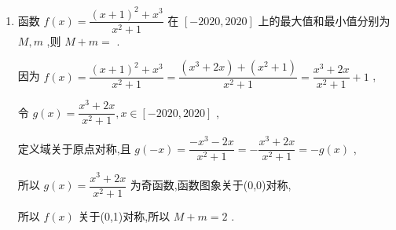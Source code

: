 \begin{enumerate}
\begin{jieda}
        于是 $h\left( {-{10}}\right)  =  - h\left( {10}\right)$ ,所以 $f\left( {-{10}}\right)  - {\left( -{10}\right) }^{2} + {2023} =  - \left\lbrack  {f\left( {10}\right)  - {10}^{2} + {2023}}\right\rbrack$ ,
        
        可得 $f\left( {-{10}}\right)  =  - f\left( {10}\right)  - {3846}$ ,
        
        又 $f\left( {10}\right)  = 6$ ,因此 $f\left( {-{10}}\right)  =  - {3852}$
    \end{jieda}
    
    \item 函数 $f\left( x\right)  = \dfrac{{\left( x + 1\right) }^{2} + {x}^{3}}{{x}^{2} + 1}$ 在 $\left\lbrack  {-{2020},{2020}}\right\rbrack$ 上的最大值和最小值分别为 $M,m$ ,则 $M + m =$ .
    \begin{jieda}
        因为 $f\left( x\right)  = \dfrac{{\left( x + 1\right) }^{2} + {x}^{3}}{{x}^{2} + 1} = \dfrac{\left( {{x}^{3} + {2x}}\right)  + \left( {{x}^{2} + 1}\right) }{{x}^{2} + 1} = \dfrac{{x}^{3} + {2x}}{{x}^{2} + 1} + 1$ ,
        
        令 $g\left( x\right)  = \dfrac{{x}^{3} + {2x}}{{x}^{2} + 1},x \in  \left\lbrack  {-{2020},{2020}}\right\rbrack$ ,
        
        定义域关于原点对称,且 $g\left( {-x}\right)  = \dfrac{-{x}^{3} - {2x}}{{x}^{2} + 1} =  - \dfrac{{x}^{3} + {2x}}{{x}^{2} + 1} =  - g\left( x\right)$ ,
        
        所以 $g\left( x\right)  = \dfrac{{x}^{3} + {2x}}{{x}^{2} + 1}$ 为奇函数,函数图象关于(0,0)对称,
        
        所以 $f\left( x\right)$ 关于(0,1)对称,所以 $M + m = 2$ .
    \end{jieda}
    

\end{enumerate}
